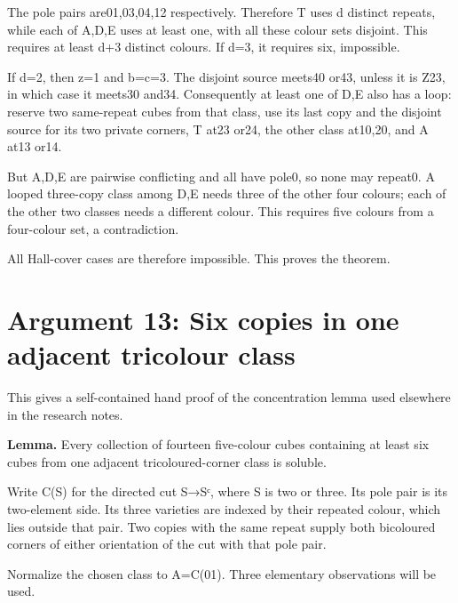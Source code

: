 \documentclass[
  10pt,
]{article}
\begin{document}
The pole pairs are01,03,04,12 respectively. Therefore T uses d distinct
repeats, while each of A,D,E uses at least one, with all these colour
sets disjoint. This requires at least d+3 distinct colours. If d=3, it
requires six, impossible.

If d=2, then z=1 and b=c=3. The disjoint source meets40 or43, unless it
is Z23, in which case it meets30 and34. Consequently at least one of D,E
also has a loop: reserve two same-repeat cubes from that class, use its
last copy and the disjoint source for its two private corners, T at23
or24, the other class at10,20, and A at13 or14.

But A,D,E are pairwise conflicting and all have pole0, so none may
repeat0. A looped three-copy class among D,E needs three of the other
four colours; each of the other two classes needs a different colour.
This requires five colours from a four-colour set, a contradiction.

All Hall-cover cases are therefore impossible. This proves the theorem.

\hypertarget{arg-13}{%
\section{Argument 13: Six copies in one adjacent tricolour
class}\label{arg-13}}

This gives a self-contained hand proof of the concentration lemma used
elsewhere in the research notes.

\textbf{Lemma.} Every collection of fourteen five-colour cubes
containing at least six cubes from one adjacent tricoloured-corner class
is soluble.

Write C(S) for the directed cut S→Sᶜ, where \textbar S\textbar{} is two
or three. Its pole pair is its two-element side. Its three varieties are
indexed by their repeated colour, which lies outside that pair. Two
copies with the same repeat supply both bicoloured corners of either
orientation of the cut with that pole pair.

Normalize the chosen class to A=C(01). Three elementary observations
will be used.
\end{document}
